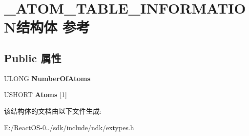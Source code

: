 \hypertarget{struct___a_t_o_m___t_a_b_l_e___i_n_f_o_r_m_a_t_i_o_n}{}\section{\+\_\+\+A\+T\+O\+M\+\_\+\+T\+A\+B\+L\+E\+\_\+\+I\+N\+F\+O\+R\+M\+A\+T\+I\+O\+N结构体 参考}
\label{struct___a_t_o_m___t_a_b_l_e___i_n_f_o_r_m_a_t_i_o_n}
\subsection*{Public 属性}
\begin{DoxyCompactItemize}
\item 
\mbox{\label{struct___a_t_o_m___t_a_b_l_e___i_n_f_o_r_m_a_t_i_o_n_a5aba499104e2ef57d16fb0f590b5040b}} 
U\+L\+O\+NG {\bfseries Number\+Of\+Atoms}
\item 
\mbox{\label{struct___a_t_o_m___t_a_b_l_e___i_n_f_o_r_m_a_t_i_o_n_a44b4b685e886d48b242c7e5bd36d96fb}} 
U\+S\+H\+O\+RT {\bfseries Atoms} \mbox{[}1\mbox{]}
\end{DoxyCompactItemize}


该结构体的文档由以下文件生成\+:\begin{DoxyCompactItemize}
\item 
E\+:/\+React\+O\+S-\/0../sdk/include/ndk/extypes.\+h\end{DoxyCompactItemize}
